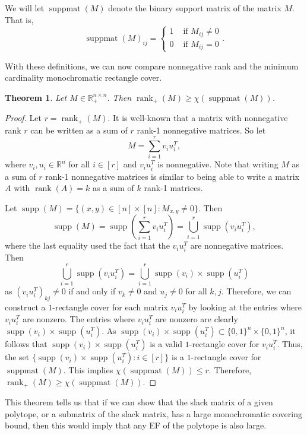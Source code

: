 \documentclass{article}
\newtheorem{theorem}{\sc Theorem}
\theoremstyle{definition}
\theoremstyle{remark}
\newcommand{\nrank}{\operatorname{rank}_+}
\newcommand{\rank}{\operatorname{rank}}
\newcommand{\bits}{\{0,1\}}
\newcommand{\suppmat}{\operatorname{suppmat}}
\newcommand{\supp}{\operatorname{supp}}
\renewcommand{\R}{\mathbb{R}}
\begin{document}
We will let $\suppmat(M)$ denote the binary support matrix of the matrix $M$. That is, 
\[
\suppmat(M)_{ij} = \begin{cases}
1 & \text{ if } M_{ij} \ne 0 \\
0 & \text{ if } M_{ij} = 0
\end{cases}.
\]

With these definitions, we can now compare nonnegative rank and the minimum cardinality monochromatic rectangle cover.

\begin{theorem}\label{theor:suppmat}
Let $M \in \R_+^{n \times n}$. Then $\rank_+(M) \ge \chi(\suppmat(M))$.
\end{theorem}
\begin{proof}
Let $r = \nrank(M)$. It is well-known that a matrix with nonnegative rank $r$ can be written as a sum of $r$ rank-1 nonnegative matrices. So let
\[
M = \sum_{i=1}^r v_iu_i^T,
\]
where $v_i, u_i \in \R^n$ for all $i \in [r]$ and $v_iu_i^T$ is nonnegative.
Note that writing $M$ as a sum of $r$ rank-1 nonnegative matrices is similar to being able to write a matrix $A$ with $\rank(A) = k$ as a sum of $k$ rank-1 matrices.

Let $\supp(M) = \{(x,y) \in [n] \times [n] : M_{x,y} \ne 0\}$. Then
\[
\supp(M) = \supp\left(\sum_{i=1}^r v_iu_i^T\right) = \bigcup_{i=1}^r \supp(v_iu_i^T), 
\]
where the last equality used the fact that the $v_iu_i^T$ are nonnegative matrices. Then 
\[
\bigcup_{i=1}^r \supp(v_iu_i^T) = \bigcup_{i=1}^r \supp(v_i) \times \supp(u_i^T) 
\]
as $(v_iu_i^T)_{kj} \ne 0$ if and only if $v_k \ne 0$ and $u_j \ne 0$ for all $k,j$. Therefore, we can construct a $1$-rectangle cover for each matrix $v_iu_i^T$ by looking at the entries where $v_iu_i^T$ are nonzero. The entries where $v_iu_i^T$ are nonzero are clearly $\supp(v_i) \times \supp(u_i^T)$. As $\supp(v_i) \times \supp(u_i^T) \subset \bits^n \times \bits^n$, it follows that $\supp(v_i) \times \supp(u_i^T)$ is a valid $1$-rectangle cover for $v_iu_i^T$. Thus, the set $\{\supp(v_i) \times \supp(u_i^T) : i \in [r]\}$ is a $1$-rectangle cover for $\suppmat(M)$. This implies $\chi(\suppmat(M)) \le r$. Therefore, $\nrank(M) \ge \chi(\suppmat(M))$.
\end{proof}

This theorem tells us that if we can show that the slack matrix of a given polytope, or a submatrix of the slack matrix, has a large monochromatic covering bound, then this would imply that any EF of the polytope is also large.
\end{document}

